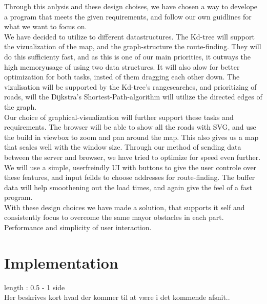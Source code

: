 \documentclass[a4paper,10pt,titlepage]{article}
\begin{document}
Through this anlysis and these design choises, we have chosen a way to develope a program that meets the given requirements, and follow our own guidlines for what we want to focus on.\\
We have decided to utilize to different datastructures. The Kd-tree will support the vizualization of the map, and the graph-structure the route-finding. They will do this sufficienty fast, and as this is one of our main priorities, it outways the high memoryusage of using two data structures. It will also alow for better optimization for both tasks, insted of them dragging each other down. The vizulisation will be supported by the Kd-tree's rangesearches, and prioritizing of roads, will the Dijkstra's Shortest-Path-algorithm will utilize the directed edges of the graph.\\
Our choice of graphical-visualization will further support these tasks and requirements. The browser will be able to show all the roads with SVG, and use the build in viewbox to zoom and pan around the map. This also gives us a map that scales well with the window size. Through our method of sending data between the server and browser, we have tried to optimize for speed even further.\\
We will use a simple, userfreindly UI with buttons to give the user controle over these features, and input feilds to choose addresses for route-finding. The buffer data will help smoothening out the load times, and again give the feel of a fast program. \\
With these design choices we have made a solution, that supports it self and consistently focus to overcome the same mayor obstacles in each part. Performance and simplicity of user interaction.
			
	\newpage		
	\section{Implementation}
		length : 0.5 - 1 side\\
		Her beskrives kort hvad der kommer til at være i det kommende afsnit..
		
\end{document}
